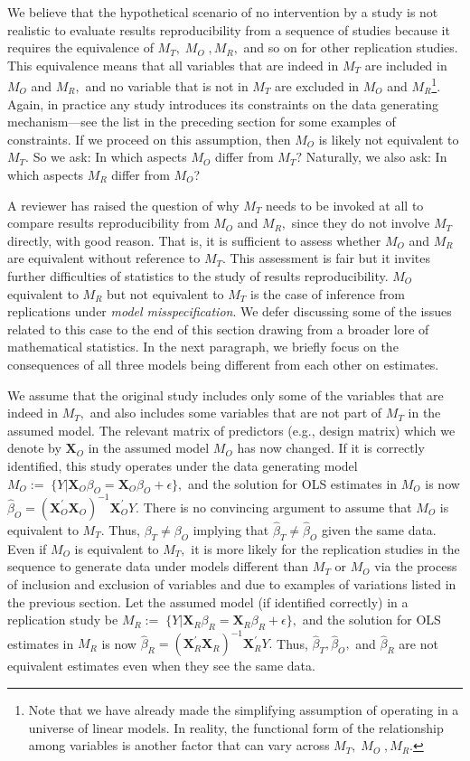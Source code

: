 \documentclass[meta,authordate,issue]{jote-new-article}
\newcommand{\X}{\mathbf{X}}
\newcounter{result}
\begin{document}
We believe that the hypothetical scenario of no intervention by a study is not realistic to evaluate results reproducibility from a sequence of studies because it requires the equivalence of $M_T,\;M_O\;,M_R,$ and so on for other replication studies. This equivalence means that all variables that are indeed in $M_T$ are included in $M_O$ and $M_R,$ and no variable that is not in $M_T$ are excluded in $M_O$ and $M_R$\footnote{Note that we have already made the simplifying assumption of operating in a universe of linear models. In reality, the functional form of the relationship among variables is another factor that can vary across $M_T,\;M_O\;,M_R$.}. Again, in practice any study introduces its constraints on the data generating mechanism---see the list in the preceding section for some examples of constraints. If we proceed on this assumption, then $M_O$ is likely not equivalent to $M_T.$ So we ask: In which aspects $M_O$ differ from $M_T?$ Naturally, we also ask: In which aspects $M_R$ differ from $M_O$?

A reviewer has raised the question of why $M_T$ needs to be invoked at all to compare results reproducibility from $M_O$ and $M_R,$ since they do not involve $M_T$ directly, with good reason. That is, it is sufficient to assess whether $M_O$ and $M_R$ are equivalent without reference to $M_T$. This assessment is fair but it invites further difficulties of statistics to the study of results reproducibility. $M_O$ equivalent to $M_R$ but not equivalent to $M_T$ is the case of inference from replications under {\em model misspecification}. We defer discussing some of the issues related to this case to the end of this section drawing from a broader lore of mathematical statistics. In the next paragraph, we briefly focus on the consequences of all three models being different from each other on estimates.

We assume that the original study includes only some of the variables that are indeed in $M_T,$ and also includes some variables that are not part of $M_T$ in the assumed model. The relevant matrix of predictors (e.g., design matrix) which we denote by $\X_{O}$ in the assumed model $M_O$ has now changed. If it is correctly identified, this study operates under the data generating model
%
$M_O:=\; \{Y|\X_{O}\beta_{O} = \X_{O}\beta_{O}+\epsilon\},$
%
and the solution for OLS estimates in $M_O$ is now
$\hat{\beta}_{O}= (\X_{O}^{'}\X_{O})^{-1}\X_{O}^{'} Y.$
%
There is no convincing argument to assume that $M_O$ is equivalent to $M_T.$ Thus, $\beta_{T} \neq \beta_{O}$ implying that $\hat{\beta}_{T} \neq \hat{\beta}_{O}$ given the same data. Even if $M_O$ is equivalent to $M_T,$ it is more likely for the replication studies in the sequence to generate data under models different than $M_T$ or $M_O$ via the process of inclusion and exclusion of variables and due to examples of variations listed in the previous section. Let the assumed model (if identified correctly) in a replication study be
%
$M_R:=\; \{Y|\X_{R}\beta_{R} =\X_{R}\beta_{R}+\epsilon\},
$
%
and the solution for OLS estimates in $M_R$ is now
$\hat{\beta}_{R}= (\X_{R}^{'}\X_{R})^{-1}\X_{R}^{'} Y.$
%
%
Thus, $\hat{\beta}_{T}, \hat{\beta}_{O},$ and $\hat{\beta}_{R}$ are not equivalent estimates even when they see the same data.
\end{document}
